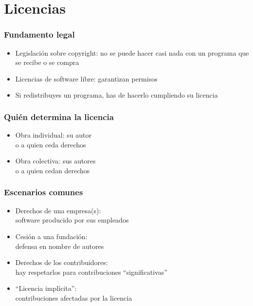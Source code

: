 \documentclass[17pt,aspectratio=169]{beamer}
\begin{document}
\section{Licencias}


\begin{frame}
\frametitle{Fundamento legal}

\begin{itemize}
\item Legislación sobre copyright:
  no se puede hacer casi nada con un programa
  que se recibe o se compra
\item Licencias de software libre: garantizan permisos
\item Si redistribuyes un programa, has de hacerlo cumpliendo su licencia
\end{itemize}

\end{frame}


\begin{frame}
\frametitle{Quién determina la licencia}

\begin{itemize}
\item Obra individual: su autor \\
  o a quien ceda derechos
\item Obra colectiva: sus autores \\
  o a quien cedan derechos
\end{itemize}

\end{frame}


\begin{frame}
\frametitle{Escenarios comunes}

\begin{itemize}
\item Derechos de una empresa(s): \\
  software producido por sus empleados
\item Cesión a una fundación: \\
  defensa en nombre de autores
\item Derechos de los contribuidores: \\
  hay respetarlos para contribuciones ``significativas''
\item ``Licencia implícita'': \\
  contribuciones afectadas por la licencia
\end{itemize}

\end{frame}
\end{document}
